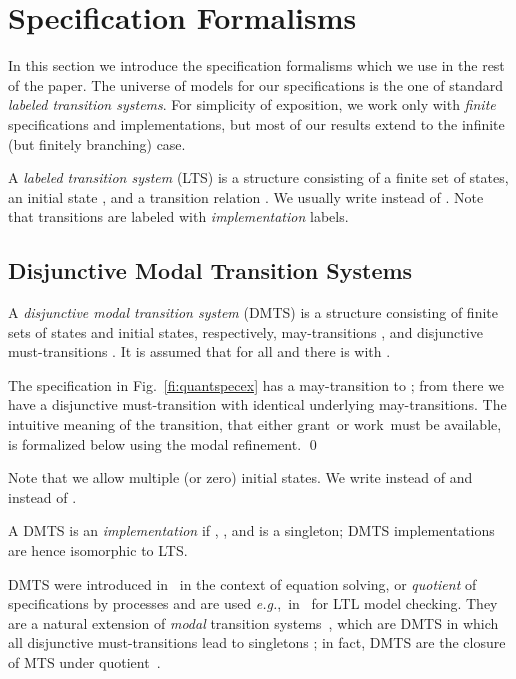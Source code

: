 \documentclass[twocolumn]{svjour3-dummy}
\newcommand*\grant{\textsf{grant}}
\newcommand*\work{\textsf{work}}
\newcommand*\eg{\textit{e.g.},}
\begin{document}
\section{Specification Formalisms}
\label{se:formalisms}

In this section we introduce the specification formalisms which we use
in the rest of the paper.  The universe of models for our specifications
is the one of standard \emph{labeled transition systems}.  For
simplicity of exposition, we work only with \emph{finite} specifications
and implementations, but most of our results extend to the infinite (but
finitely branching) case.

A \emph{labeled transition system} (LTS) is a structure  consisting of a finite set  of states, an initial state
, and a transition relation .  We usually write  instead of .  Note that transitions are labeled with
\emph{implementation} labels.

\subsection{Disjunctive Modal Transition Systems}

A \emph{disjunctive modal transition system} (DMTS) is a structure
 consisting of finite sets  of states and initial states, respectively, may-tran\-sitions
, and disjunctive
must-transitions .  It is
assumed that for all  and  there is  with .

\begin{example}
  The specification  in Fig.~\ref{fi:quantspecex} has a
  may-transition to ; from there we have a disjunctive
  must-transition with identical underlying may-transitions. The
  intuitive meaning of the transition, that either \grant\ or \work\
  must be available, is formalized below using the modal
  refinement. \qed
\end{example}

Note that we allow multiple (or zero) initial states.  We write
 instead of  and 
instead of .

A DMTS  is an \emph{implementation} if
, , and  is a singleton; DMTS
implementations are hence isomorphic to LTS.

DMTS were introduced in~\cite{DBLP:conf/lics/LarsenX90} in the context
of equation solving, or \emph{quotient} of specifications by processes
and are used \eg~in~\cite{DBLP:conf/atva/BenesCK11} for LTL model
checking.  They are a natural extension of \emph{modal} transition
systems~\cite{DBLP:conf/lics/LarsenT88}, which are DMTS in which all
disjunctive must-transitions  lead to singletons ; in fact, DMTS are the closure of MTS under
quotient~\cite{DBLP:conf/lics/LarsenX90}.
\end{document}
